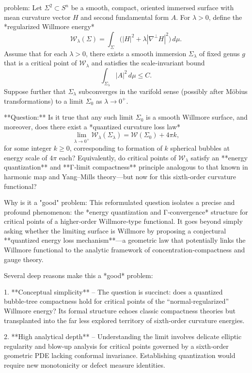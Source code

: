 problem:  
Let $\Sigma^2 \subset S^n$ be a smooth, compact, oriented immersed surface with mean curvature vector $H$ and second fundamental form $A$.  
For $\lambda>0$, define the *regularized Willmore energy*
\[
\mathcal{W}_\lambda(\Sigma) = \int_\Sigma \big(|H|^2 + \lambda |\nabla^\perp H|^2\big)\, d\mu.
\]
Assume that for each $\lambda>0$, there exists a smooth immersion $\Sigma_\lambda$ of fixed genus $g$ that is a critical point of $\mathcal{W}_\lambda$ and satisfies the scale‑invariant bound
\[
\int_{\Sigma_\lambda} |A|^2 \, d\mu \le C.
\]
Suppose further that $\Sigma_\lambda$ subconverges in the varifold sense (possibly after Möbius transformations) to a limit $\Sigma_0$ as $\lambda \to 0^+$.

**Question:**  
Is it true that any such limit $\Sigma_0$ is a smooth Willmore surface, and moreover, does there exist a *quantized curvature loss law*
\[
\lim_{\lambda\to 0^+} \mathcal{W}_\lambda(\Sigma_\lambda) = \mathcal{W}(\Sigma_0) + 4\pi k,
\]
for some integer $k\ge0$, corresponding to formation of $k$ spherical bubbles at energy scale of $4\pi$ each?  
Equivalently, do critical points of $\mathcal{W}_\lambda$ satisfy an **energy quantization** and **Γ‑limit compactness** principle analogous to that known in harmonic map and Yang–Mills theory—but now for this sixth‑order curvature functional?

Why is it a "good" problem:  
This reformulated question isolates a precise and profound phenomenon: the *energy quantization and Γ‑convergence* structure for critical points of a higher‑order Willmore‑type functional.  
It goes beyond simply asking whether the limiting surface is Willmore by proposing a conjectural **quantized energy loss mechanism**—a geometric law that potentially links the Willmore functional to the analytic framework of concentration‑compactness and gauge theory.

Several deep reasons make this a *good* problem:

1. **Conceptual simplicity** – The question is succinct: does a quantized bubble‑tree compactness hold for critical points of the “normal‑regularized” Willmore energy?  
   Its formal structure echoes classic compactness theories but transplanted into the far less explored territory of sixth‑order curvature energies.

2. **High analytical depth** – Understanding the limit involves delicate elliptic regularity and blow‑up analysis for critical points governed by a sixth‑order geometric PDE lacking conformal invariance.  
   Establishing quantization would require new monotonicity or defect measure identities.

